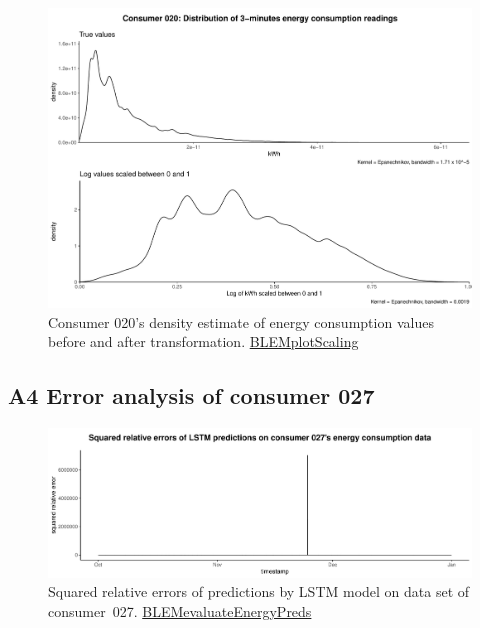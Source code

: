 \begin{centering}
\begin{figure}[!htbp]
        \includegraphics[width=\textwidth-0.85cm]{thesis/graphs/c020_density.pdf}
        \caption[Exemplary energy consumption distribution before and after transformation]{Consumer 020's density estimate of energy consumption values before and after transformation. \quantnet\href{https://github.com/QuantLet/BLEM/tree/master/BLEMplotScaling}{BLEMplotScaling}}
\end{figure}
\end{centering}


\subsection*{\hypertarget{AppA4:Figures:erroranalysis}{A4} Error analysis of consumer 027}\label{AppA4:Figures:erroranalysis}

\begin{centering}
\begin{figure}[H]
    \includegraphics[width=\textwidth]{thesis/graphs/evaluation/c027_squarederrors.pdf}
    \caption[Squared relative errors of predictions by LSTM model on consumer 027]{Squared relative errors of predictions by LSTM model on data set of consumer~027. \quantnet\href{https://github.com/QuantLet/BLEM/tree/master/BLEMevaluateEnergyPreds}{BLEMevaluateEnergyPreds}}
\end{figure}
\end{centering}


